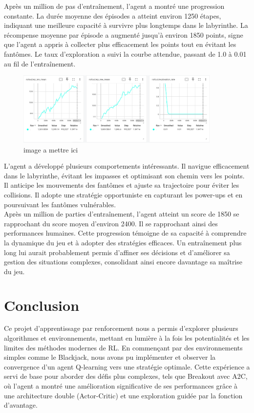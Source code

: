 \documentclass{article}
\begin{document}
Après un million de pas d’entraînement, l’agent a montré une progression constante. La durée moyenne des épisodes a atteint environ 1250 étapes, indiquant une meilleure capacité à survivre plus longtemps dans le labyrinthe. La récompense moyenne par épisode a augmenté jusqu’à environ 1850 points, signe que l’agent a appris à collecter plus efficacement les points tout en évitant les fantômes. Le taux d’exploration a suivi la courbe attendue, passant de 1.0 à 0.01 au fil de l’entraînement.\\

\begin{figure}[ht]
    \centering
    \includegraphics[width=0.9\textwidth]{13.png}
    \caption{image a mettre ici}
\end{figure}

L’agent a développé plusieurs comportements intéressants. Il navigue efficacement dans le labyrinthe, évitant les impasses et optimisant son chemin vers les points. Il anticipe les mouvements des fantômes et ajuste sa trajectoire pour éviter les collisions. Il adopte une stratégie opportuniste en capturant les power-ups et en poursuivant les fantômes vulnérables.\\

Après un million de parties d’entraînement, l’agent atteint un score de 1850 se rapprochant du score moyen d’environ 2400. Il se rapprochant ainsi des performances humaines. Cette progression témoigne de sa capacité à comprendre la dynamique du jeu et à adopter des stratégies efficaces. Un entraînement plus long lui aurait probablement permis d’affiner ses décisions et d’améliorer sa gestion des situations complexes, consolidant ainsi encore davantage sa maîtrise du jeu.

\clearpage

\section{Conclusion}
\quad Ce projet d'apprentissage par renforcement nous a permis d'explorer plusieurs algorithmes et environnements, mettant en lumière à la fois les potentialités et les limites des méthodes modernes de RL. En commençant par des environnements simples comme le Blackjack, nous avons pu implémenter et observer la convergence d'un agent Q-learning vers une stratégie optimale. Cette expérience a servi de base pour aborder des défis plus complexes, tels que Breakout avec A2C, où l'agent a montré une amélioration significative de ses performances grâce à une architecture double (Actor-Critic) et une exploration guidée par la fonction d'avantage.\\
\end{document}
